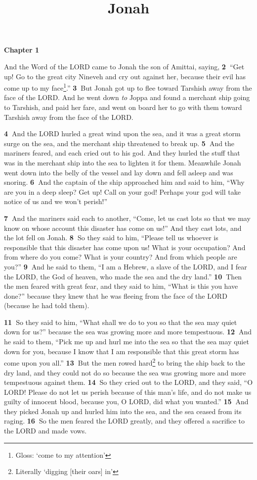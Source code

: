 \documentclass[
]{article}
\title{Jonah}
\author{}
\date{}
\newcommand{\RL}[1]{\beginR #1\endR}
\begin{document}
\maketitle

\textbf{Chapter 1~}

And the Word of the LORD came to Jonah the son of Amittai, saying,
\textbf{2~}\RL{``}Get up! Go to the great city Nineveh and cry out
against her, because their evil has come up to my face\footnote{Gloss:
  `come to my attention'}.'' \textbf{3~}But Jonah got up to flee toward
Tarshish away from the face of the LORD. And he went down \emph{to}
Joppa and found a merchant ship going to Tarshish, and paid her fare,
and went on board her to go with them toward Tarshish away from the face
of the LORD.

\textbf{4~}And the LORD hurled a great wind upon the sea, and it was a
great storm surge on the sea, and the merchant ship threatened to break
up. \textbf{5~}And the mariners feared, and each cried out to his god.
And they hurled the stuff that was in the merchant ship into the sea to
lighten it for them. Meanwhile Jonah went down into the belly of the
vessel and lay down and fell asleep and was snoring. \textbf{6~}And the
captain of the ship approached him and said to him, \RL{``}Why are you
in a deep sleep? Get up! Call on your god! Perhaps your god will take
notice of us and we won\RL{'}t perish!''

\textbf{7~}And the mariners said each to another, \RL{``}Come, let us
cast lots so that we may know on whose account this disaster has come on
us!'' And they cast lots, and the lot fell on Jonah. \textbf{8~}So they
said to him, \RL{``}Please tell us whoever is responsible that this
disaster has come upon us! What is your occupation? And from where do
you come? What is your country? And from which people are you?''
\textbf{9~}And he said to them, \RL{``}I am a Hebrew, a slave of the
LORD, and I fear the LORD, the God of heaven, who made the sea and the
dry land.'' \textbf{10~}Then the men feared with great fear, and they
said to him, \RL{``}What is this you have done?'' because they knew that
he was fleeing from the face of the LORD (because he had told them).

\textbf{11~}So they said to him, \RL{``}What shall we do to you so that
the sea may quiet down for us?'' because the sea was growing more and
more tempestuous. \textbf{12~}And he said to them, \RL{``}Pick me up and
hurl me into the sea so that the sea may quiet down for you, because I
know that I am responsible that this great storm has come upon you
all.'' \textbf{13~}But the men rowed hard\footnote{Literally `digging
  {[}their oars{]} in'} to bring the ship back to the dry land, and they
could not do so because the sea was growing more and more tempestuous
against them. \textbf{14~}So they cried out to the LORD, and they said,
\RL{``}O LORD! Please do not let us perish because of this man\RL{'}s
life, and do not make us guilty of innocent blood, because you, O LORD,
did what you wanted.'' \textbf{15~}And they picked Jonah up and hurled
him into the sea, and the sea ceased from its raging. \textbf{16~}So the
men feared the LORD greatly, and they offered a sacrifice to the LORD
and made vows.
\end{document}
